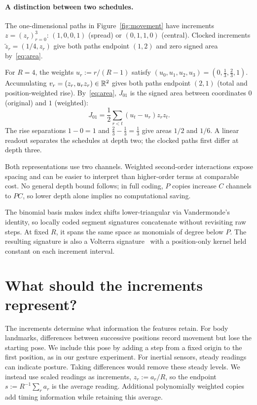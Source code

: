 \documentclass[a4paper]{esannV2}
\begin{document}
\paragraph{A distinction between two schedules.}
The one-dimensional paths in Figure~\ref{fig:movement} have increments
$z=(z_r)_{r=0}^{3}$: $(1,0,0,1)$ (spread) or $(0,1,1,0)$ (central).
Clocked increments $\tilde z_r=(1/4,z_r)$ give both paths endpoint $(1,2)$
and zero signed area by~\eqref{eq:area}.

For $R=4$, the weights \mbox{$u_r:=r/(R-1)$} satisfy
$(u_0,u_1,u_2,u_3)=(0,\tfrac13,\tfrac23,1)$.
Accumulating $v_r=(z_r,u_rz_r)\in\mathbb{R}^2$ gives both paths endpoint $(2,1)$
(total and position-weighted rise). By~\eqref{eq:area}, $J_{01}$ is the signed
area between coordinates $0$ (original) and $1$ (weighted):
\begin{equation}
 J_{01}=\frac12\sum_{r<t}(u_t-u_r)z_rz_t.
 \label{eq:sep}
\end{equation}
The rise separations $1-0=1$ and $\tfrac23-\tfrac13=\tfrac13$ give areas
$1/2$ and $1/6$. A linear readout separates the schedules at depth two;
the clocked paths first differ at depth three.

Both representations use two channels. Weighted second-order interactions
expose spacing and can be easier to interpret than higher-order terms at
comparable cost.
No general depth bound follows; in full coding, $P$ copies increase $C$
channels to $PC$, so lower depth alone implies no computational saving.

The binomial basis makes index shifts lower-triangular via Vandermonde's
identity, so locally coded segment signatures concatenate without revisiting
raw steps. At fixed $R$, it spans the same space as monomials of degree below
$P$. The resulting signature is also a Volterra signature~\cite{volterra} with
a position-only kernel held constant on each increment interval.

\section{What should the increments represent?}
The increments determine what information the features retain. For body
landmarks, differences between successive positions record movement but lose the
starting pose. We include this pose by adding a step from a fixed origin to the
first position, as in our gesture experiment. For inertial sensors, steady
readings can indicate posture. Taking differences would remove these steady
levels. We instead use scaled readings as increments, $z_r:=a_r/R$, so the
endpoint $s:=R^{-1}\sum_r a_r$ is the average reading. Additional polynomially
weighted copies add timing information while retaining this average.
\end{document}
